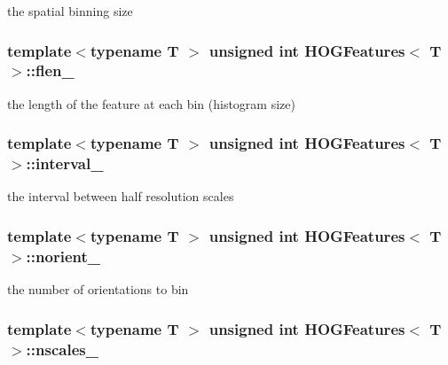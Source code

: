 the spatial binning size 

\hypertarget{classHOGFeatures_ae895d79d7725afb35846cd3e08be6b74}{
\subsubsection[{flen\-\_\-}]{\setlength{\rightskip}{0pt plus 5cm}template$<$typename T $>$ unsigned int {\bf \-H\-O\-G\-Features}$<$ \-T $>$\-::{\bf flen\-\_\-}}}\label{classHOGFeatures_ae895d79d7725afb35846cd3e08be6b74}


the length of the feature at each bin (histogram size) 

\hypertarget{classHOGFeatures_a5e73ec994a2f8cae1b466bad5a9cb2a3}{
\subsubsection[{interval\-\_\-}]{\setlength{\rightskip}{0pt plus 5cm}template$<$typename T $>$ unsigned int {\bf \-H\-O\-G\-Features}$<$ \-T $>$\-::{\bf interval\-\_\-}}}\label{classHOGFeatures_a5e73ec994a2f8cae1b466bad5a9cb2a3}


the interval between half resolution scales 

\hypertarget{classHOGFeatures_a549b2c1d78c2fcabe8d2692f7f466687}{
\subsubsection[{norient\-\_\-}]{\setlength{\rightskip}{0pt plus 5cm}template$<$typename T $>$ unsigned int {\bf \-H\-O\-G\-Features}$<$ \-T $>$\-::{\bf norient\-\_\-}}}\label{classHOGFeatures_a549b2c1d78c2fcabe8d2692f7f466687}


the number of orientations to bin 

\hypertarget{classHOGFeatures_a503011deedc5ff736fa135149a2919f9}{
\subsubsection[{nscales\-\_\-}]{\setlength{\rightskip}{0pt plus 5cm}template$<$typename T $>$ unsigned int {\bf \-H\-O\-G\-Features}$<$ \-T $>$\-::{\bf nscales\-\_\-}}}\label{classHOGFeatures_a503011deedc5ff736fa135149a2919f9}


